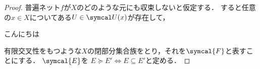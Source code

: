 \documentclass{ltjsbook}
\begin{document}
\begin{proof} 普遍ネット\(f\)が\(X\)のどのような元にも収束しないと仮定する．
すると任意の\(x \in X\)についてある\(U \in \OpenNeighborhood{x}\)が存在して，


こんにちは


有限交叉性をもつような\(X\)の閉部分集合族をとり，それを\(\symcal{F}\)と表すことにする．
\(\symcal{E}\)を
\(E \succeq E' \Leftrightarrow E \subseteq E'\)と定める．


\end{proof}
\end{document}
